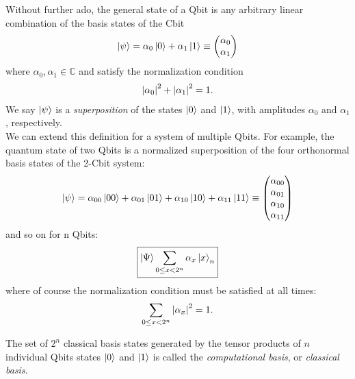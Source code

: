 \documentclass{book}
\theoremstyle{definition}
\newcommand{\C}{\mathbb{C}}
\newcommand{\al}{\alpha}
\begin{document}
Without further ado, the general state of a Qbit is any arbitrary linear combination of the basis states of the Cbit
\begin{align}
\ket{\psi} = \alpha_0 \ket{0} + \alpha_1\ket{1} \equiv \begin{pmatrix}
\alpha_0 \\ \alpha_1
\end{pmatrix}
\end{align}
where $\alpha_0, \alpha_1 \in \C$ and satisfy the normalization condition
\begin{align}
\abs{\alpha_0}^2 + \abs{\al_1}^2 = 1.
\end{align}
We say $\ket{\psi}$ is a \textit{superposition} of the states $\ket{0}$ and $\ket{1}$, with amplitudes $\alpha_0$ and $\alpha_1$, respectively. \\

We can extend this definition for a system of multiple Qbits. For example, the quantum state of two Qbits is a normalized superposition of the four orthonormal basis states of the 2-Cbit system:
\begin{align}
\ket{\psi} = \alpha_{00}\ket{00} + \alpha_{01}\ket{01} + \alpha_{10}\ket{10} + \alpha_{11}\ket{11} \equiv \begin{pmatrix}
\al_{00} \\ \al_{01} \\\al_{10} \\\al_{11} 
\end{pmatrix}
\end{align}
and so on for n Qbits:
\begin{align}
\boxed{\ket{\Psi} \sum_{0 \leq x < 2^n} \alpha_x \ket{x}_n}
\end{align}
where of course the normalization condition must be satisfied at all times:
\begin{align}
\sum_{0 \leq x < 2^n} \abs{\alpha_x}^2 = 1.
\end{align}


The set of $2^n$ classical basis states generated by the tensor products of $n$ individual Qbits states $\ket{0}$ and $\ket{1}$ is called the \textit{computational basis}, or \textit{classical basis}. \\
\end{document}
